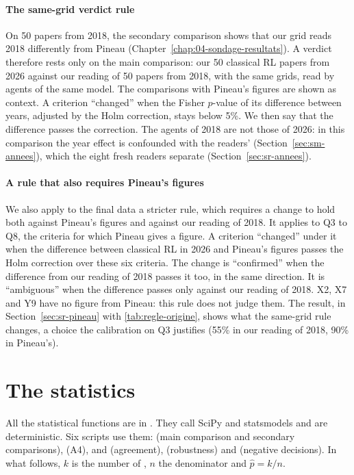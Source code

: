 \paragraph{The same-grid verdict rule}
On 50 papers from 2018, the secondary comparison shows that our grid reads 2018 differently from
Pineau (Chapter~\ref{chap:04-sondage-resultats}). A verdict therefore rests only on the main
comparison: our 50 classical RL papers from 2026 against our reading of 50 papers from 2018, with the
same grids, read by agents of the same model. The comparisons with Pineau's figures are shown as
context. A criterion
\enquote{changed} when the Fisher $p$-value of its difference between years, adjusted by the Holm
correction, stays below 5\%. We then say that the difference passes the correction. The agents of
2018 are not those of 2026: in this comparison the year effect is confounded with the readers'
(Section~\ref{sec:sm-annees}), which the eight fresh readers separate
(Section~\ref{sec:sr-annees}).

\paragraph{A rule that also requires Pineau's figures}
We also apply to the final data a stricter rule, which requires a change to hold both against
Pineau's figures and against our reading of 2018. It applies to Q3 to Q8, the criteria for which Pineau gives a
figure. A criterion \enquote{changed} under it when the difference between classical RL in 2026 and
Pineau's figures passes the Holm correction over these six criteria. The change is \enquote{confirmed}
when the difference from our reading of 2018 passes it too, in the same direction. It is
\enquote{ambiguous} when the difference passes only against our reading of 2018. X2, X7 and Y9 have no
figure from Pineau: this rule does not judge them. The result, in Section~\ref{sec:sr-pineau}
with \cref{tab:regle-origine}, shows what the same-grid rule changes, a choice the calibration on Q3
justifies (55\% in our reading of 2018, 90\% in Pineau's).

\section{The statistics}\label{sec:sm-stats}

All the statistical functions are in . They call SciPy and statsmodels
and are deterministic. Six scripts use them:  (main comparison
and secondary comparisons),  (A4),  and
 (agreement),  (robustness) and
 (negative decisions). In what follows, $k$ is the number of ,
$n$ the denominator and $\hat{p} = k / n$.

